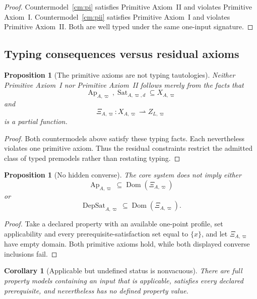 \documentclass[11pt]{article}
\newcommand{\Ap}{\operatorname{Ap}}
\newcommand{\DepSat}{\operatorname{DepSat}}
\newcommand{\Sat}{\operatorname{Sat}}
\newcommand{\Dom}{\operatorname{Dom}}
\newtheorem{proposition}[theorem]{Proposition}
\newtheorem{corollary}[theorem]{Corollary}
\theoremstyle{definition}
\theoremstyle{remark}
\begin{document}
\begin{proof}
Countermodel~\ref{cm:pi} satisfies Primitive Axiom~II and violates Primitive Axiom~I.
Countermodel~\ref{cm:pii} satisfies Primitive Axiom~I and violates Primitive Axiom~II.
Both are well typed under the same one-input signature.
\end{proof}

\subsection{Typing consequences versus residual axioms}

\begin{proposition}[The primitive axioms are not typing tautologies]
Neither Primitive Axiom~I nor Primitive Axiom~II follows merely from the facts that
\[
\Ap_{A,\varpi},\Sat_{A,\varpi,d}\subseteq X_{A,\varpi}
\]
and
\[
\Xi_{A,\varpi}:X_{A,\varpi}\rightharpoonup Z_{L,\varpi}
\]
is a partial function.
\end{proposition}

\begin{proof}
Both countermodels above satisfy these typing facts.
Each nevertheless violates one primitive axiom.
Thus the residual constraints restrict the admitted class of typed premodels rather than restating typing.
\end{proof}

\begin{proposition}[No hidden converse]
The core system does not imply either
\[
\Ap_{A,\varpi}\subseteq\Dom(\Xi_{A,\varpi})
\]
or
\[
\DepSat_{A,\varpi}\subseteq\Dom(\Xi_{A,\varpi}).
\]
\end{proposition}

\begin{proof}
Take a declared property with an available one-point profile, set applicability and every prerequisite-satisfaction set equal to \(\{x\}\), and let \(\Xi_{A,\varpi}\) have empty domain.
Both primitive axioms hold, while both displayed converse inclusions fail.
\end{proof}

\begin{corollary}[Applicable but undefined status is nonvacuous]
There are full property models containing an input that is applicable, satisfies every declared prerequisite, and nevertheless has no defined property value.
\end{corollary}
\end{document}

